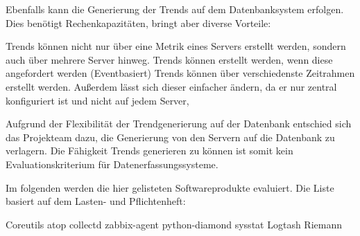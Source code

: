 Ebenfalls kann die Generierung der Trends auf dem Datenbanksystem erfolgen.
Dies benötigt Rechenkapazitäten, bringt aber diverse Vorteile:

\begin{outline}
  \1 Trends können nicht nur über eine Metrik eines Servers erstellt werden,
  sondern auch über mehrere Server hinweg.
  \1 Trends können erstellt werden, wenn diese angefordert werden
  (Eventbasiert)
  \1 Trends können über verschiedenste Zeitrahmen erstellt werden. Außerdem
  lässt sich dieser einfacher ändern, da er nur zentral konfiguriert ist und
  nicht auf jedem Server,
\end{outline}

Aufgrund der Flexibilität der Trendgenerierung auf der Datenbank entschied sich
das Projekteam dazu, die Generierung von den Servern auf die Datenbank zu
verlagern. Die Fähigkeit Trends generieren zu können ist somit kein
Evaluationskriterium für Datenerfassungssysteme.

Im folgenden werden die hier gelisteten Softwareprodukte evaluiert. Die Liste
basiert auf dem Lasten- und Pflichtenheft:

\begin{outline}
  \1 Coreutils
  \1 atop
  \1 collectd
  \1 zabbix-agent
  \1 python-diamond
  \1 sysstat
  \1 Logtash
  \1 Riemann
\end{outline}
\tm%

